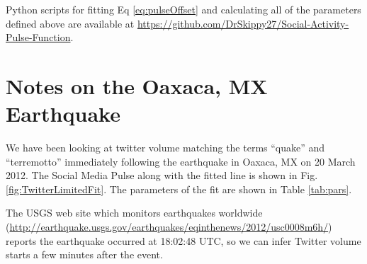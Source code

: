 \documentclass{article}
\begin{document}
%
%
%
%
%

Python scripts for fitting Eq \ref{eq:pulseOffset} and calculating all of the parameters defined above are available at \url{https://github.com/DrSkippy27/Social-Activity-Pulse-Function}.

\section{Notes on the Oaxaca, MX Earthquake}
\label{sec:intro}

We have been looking at twitter volume matching the terms ``quake'' and ``terremotto'' immediately following the earthquake in Oaxaca, MX on 20 March 2012.  The Social Media Pulse along with the fitted line is shown in Fig. \ref{fig:TwitterLimitedFit}.  The parameters of the fit are shown in Table \ref{tab:pars}.

The USGS web site which monitors earthquakes worldwide (\url{http://earthquake.usgs.gov/earthquakes/eqinthenews/2012/usc0008m6h/}) reports the earthquake occurred at 18:02:48 UTC, so we can infer Twitter volume starts a few minutes after the event.
\end{document}
